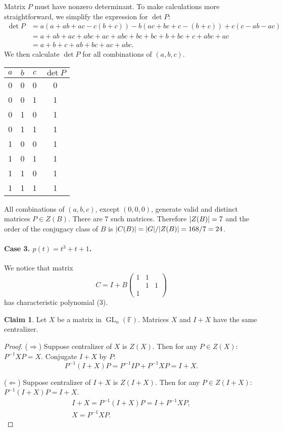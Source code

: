 \documentclass{article}
\theoremstyle{definition}
\newtheorem*{claim}{Claim}
\newcommand{\F}{\mathbb{F}}
\newcommand{\GL}{\operatorname{GL}}
\DeclarePairedDelimiter\abs{\lvert}{\rvert}
\begin{document}
Matrix $P$ must have nonzero determinant.
To make calculations more straightforward, we simplify the expression for $\det P$:
\begin{align*}
    \det P 
    & = a (a+ab+ac-c(b+c)) - b (ac + bc + c - (b+c)) + c (c - ab - ac) \\
    & = a + ab + ac + abc + ac + abc + bc + bc + b + bc + c + abc + ac \\
    & = a+b+c + ab+bc+ac + abc.
\end{align*}
We then calculate $\det P$ for all combinations of $(a,b,c)$.
\begin{center}
    \begin{tabular}{ c c c | c }
        $a$ & $b$ & $c$ & $\det P$ \\
        \hline
        0 & 0 & 0 & 0 \\
        0 & 0 & 1 & 1 \\
        0 & 1 & 0 & 1 \\
        0 & 1 & 1 & 1 \\
        1 & 0 & 0 & 1 \\
        1 & 0 & 1 & 1 \\
        1 & 1 & 0 & 1 \\
        1 & 1 & 1 & 1 \\
     \end{tabular}
\end{center}
All combinations of $(a,b,c)$, except $(0,0,0)$, generate valid and distinct matrices $P \in Z(B)$.
There are $7$ such matrices.
Therefore $\abs{Z(B)} = 7$ and the order of the conjugacy class of $B$ is $\abs{C(B)} = \abs{G} / \abs{Z(B)} = 168 / 7 = 24$.

\paragraph{Case 3. $p(t) = t^3 + t + 1$.}

We notice that matrix 
\[
    C = I + B
    \begin{pmatrix}
        1 & 1 &   \\
          & 1 & 1 \\
        1 &   & 
    \end{pmatrix}
\]
has characteristic polynomial (3).

\begin{claim}
Let $X$ be a matrix in $\GL_n(\F)$.
Matrices $X$ and $I+X$ have the same centralizer.
\end{claim}

\begin{proof}

($\Longrightarrow$)
Suppose centralizer of $X$ is $Z(X)$.
Then for any $P \in Z(X)$: $P^{-1} X P = X$.
Conjugate $I+X$ by $P$:
\[ P^{-1} (I+X) P = P^{-1} I P + P^{-1} X P = I + X. \]

($\Longleftarrow$)
Suppose centralizer of $I+X$ is $Z(I+X)$.
Then for any $P \in Z(I+X)$: $P^{-1} (I+X) P = I+X$.
\begin{gather*}
    I + X = P^{-1} (I+X) P = I + P^{-1} X P, \\
    X = P^{-1} X P.
\end{gather*}

\end{proof}
\end{document}
